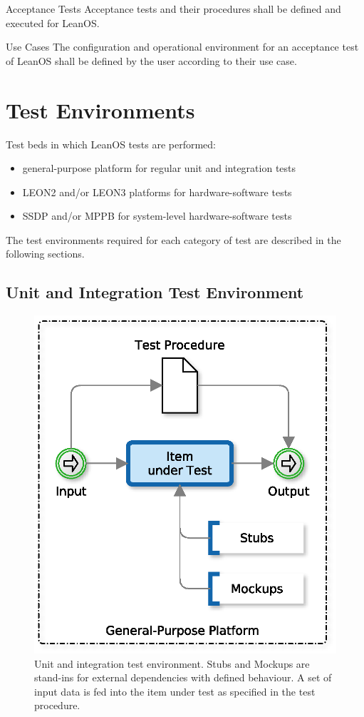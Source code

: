  {Acceptance Tests}{%
Acceptance tests and their procedures shall be defined and executed for LeanOS.
}{}

 {Use Cases}{%
The configuration and operational environment for an acceptance test of LeanOS
shall be defined by the user according to their use case.
}{}




\chapter{Test Environments}

Test beds in which LeanOS tests are performed:

\begin{itemize}
	\item general-purpose platform for regular unit and integration tests
	\item \gls{LEON2} and/or \gls{LEON3} platforms for hardware-software tests
	\item \gls{SSDP} and/or \gls{MPPB} for system-level hardware-software tests
\end{itemize}

\noindent
The test environments required for each category of test are described in the
following sections.

\newpage
\section{Unit and Integration Test Environment}

\begin{figure}[]
\begin{center}
	\includegraphics[width=0.5\columnwidth]{images/unittest}
	\caption{Unit and integration test environment. Stubs and Mockups %
	are stand-ins for external dependencies with defined behaviour. %
	A set of input data is fed into the item under test as specified %
	in the test procedure.}
	\label{fig:unittest}
\end{center}
\end{figure}

